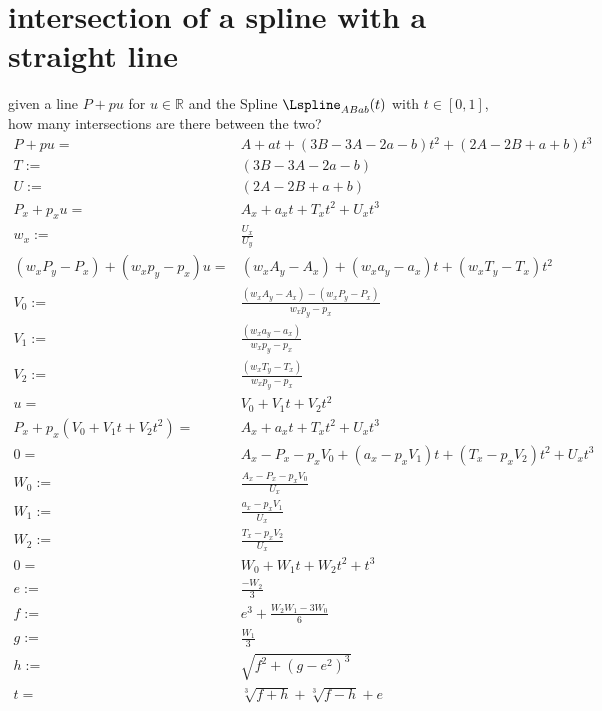 \section{intersection of a spline with a straight line}
	given a line $P + pu$ for $u \in \mathbb{R}$ and the Spline $\Lspline_{ABab}(t)$ with $t \in [0, 1]$, how many intersections are there between the two?
	$$\begin{aligned}
		P + pu =& A + at + (3B - 3A - 2a - b)t^2 + (2A - 2B + a + b)t^3 \\
		T :=& (3B - 3A - 2a - b) \\
		U :=& (2A - 2B + a + b) \\
		P_x + p_xu =& A_x + a_xt + T_xt^2 + U_xt^3 \\
		w_x :=& \frac{U_x}{U_y} \\
		(w_xP_y - P_x) + (w_xp_y - p_x)u =& (w_xA_y - A_x) + (w_xa_y - a_x)t + (w_xT_y - T_x)t^2 \\
		V_0 :=& \frac{(w_xA_y - A_x) - (w_xP_y - P_x)}{w_xp_y - p_x} \\
		V_1 :=& \frac{(w_xa_y - a_x)}{w_xp_y - p_x} \\
		V_2 :=& \frac{(w_xT_y - T_x)}{w_xp_y - p_x} \\
		u =& V_0 + V_1t + V_2t^2 \\
		P_x + p_x\left(V_0 + V_1t + V_2t^2\right) =& A_x + a_xt + T_xt^2 + U_xt^3 \\
		0 =& A_x - P_x - p_xV_0 + (a_x - p_xV_1)t + (T_x - p_xV_2)t^2 + U_xt^3 \\
		W_0 :=& \frac{A_x - P_x - p_xV_0}{U_x} \\
		W_1 :=& \frac{a_x - p_xV_1}{U_x} \\
		W_2 :=& \frac{T_x - p_xV_2}{U_x} \\
		0 =& W_0 + W_1t + W_2t^2 + t^3 \\
		e :=& \frac{-W_2}{3} \\
		f :=& e^3 + \frac{W_2W_1-3W_0}{6} \\
		g :=& \frac{W_1}{3} \\
		h :=& \sqrt{f^2 + (g - e^2)^3} \\
		t =& \sqrt[3]{f + h} + \sqrt[3]{f - h} + e \\
	\end{aligned}$$
